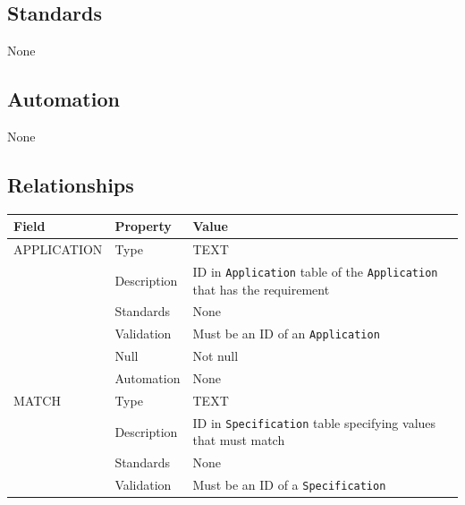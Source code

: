 \documentclass[
]{article}
\newcounter{none} %
\begin{document}
\subsection{Standards}\label{standards-28}

None

\subsection{Automation}\label{automation-28}

None

\subsection{Relationships}\label{relationships-23}

{\def\LTcaptype{none} %
\begin{longtable}[]{@{}
  >{\raggedright\arraybackslash}p{}
  >{\raggedright\arraybackslash}p{}
  >{\raggedright\arraybackslash}p{}@{}}
\toprule\noalign{}
\begin{minipage}[b]{\linewidth}\raggedright
Field
\end{minipage} & \begin{minipage}[b]{\linewidth}\raggedright
Property
\end{minipage} & \begin{minipage}[b]{\linewidth}\raggedright
Value
\end{minipage} \\
\midrule\noalign{}
\endhead
\bottomrule\noalign{}
\endlastfoot
APPLICATION & Type & TEXT \\
& Description & ID in \texttt{Application} table of the
\texttt{Application} that has the requirement \\
& Standards & None \\
& Validation & Must be an ID of an \texttt{Application} \\
& Null & Not null \\
& Automation & None \\
MATCH & Type & TEXT \\
& Description & ID in \texttt{Specification} table specifying values
that must match \\
& Standards & None \\
& Validation & Must be an ID of a \texttt{Specification} \\

\end{longtable}}
\end{document}

